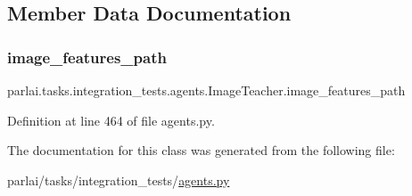 \subsection{Member Data Documentation}
\mbox{\label{classparlai_1_1tasks_1_1integration__tests_1_1agents_1_1ImageTeacher_a252433e0d09c09207362b031aa295696}} 
\subsubsection{\texorpdfstring{image\+\_\+features\+\_\+path}{image\_features\_path}}
{\footnotesize\ttfamily parlai.\+tasks.\+integration\+\_\+tests.\+agents.\+Image\+Teacher.\+image\+\_\+features\+\_\+path}



Definition at line 464 of file agents.\+py.



The documentation for this class was generated from the following file\+:\begin{DoxyCompactItemize}
\item 
parlai/tasks/integration\+\_\+tests/\hyperlink{parlai_2tasks_2integration__tests_2agents_8py}{agents.\+py}\end{DoxyCompactItemize}
